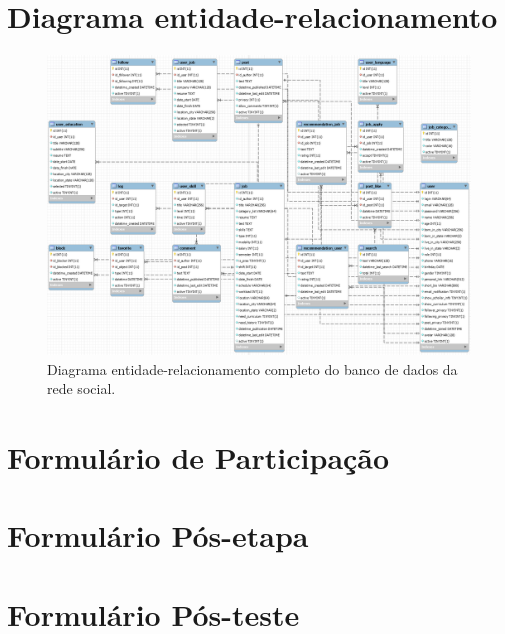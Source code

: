 \appendix
\chapter{Diagrama entidade-relacionamento}
\label{appendDER}
\begin{figure}[ht]
    \caption{Diagrama entidade-relacionamento completo do banco de dados da rede social.}
       	\begin{center}
            \includegraphics[width=1\textwidth]{figuras/der-completo.png}
        \end{center}
    \label{appendDERimg}
\end{figure}

\chapter{Formulário de Participação}
\label{appendFormPortal}


\chapter{Formulário Pós-etapa}
\label{appendFormStepPortal}


\chapter{Formulário Pós-teste}
\label{appendFormFinalPortal}
